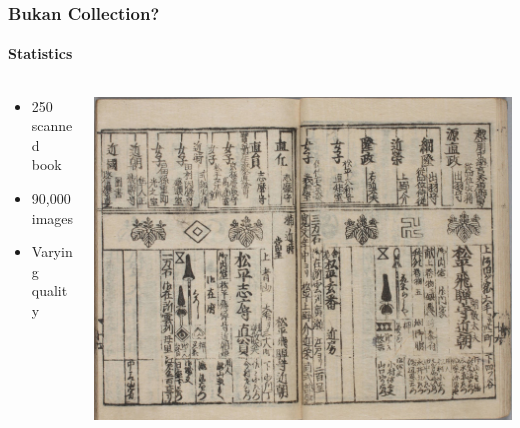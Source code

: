 \documentclass{beamer}
\begin{document}
  \begin{frame}
    \frametitle{Bukan Collection?}
    \framesubtitle{Statistics}
    \begin{columns}
      \begin{column}{0.4\linewidth}
        \begin{itemize}
        \item 250 scanned book
        \item 90,000 images
        \item Varying quality
        \end{itemize}
      \end{column}
      \begin{column}{.6\linewidth}
        \includegraphics[width=1.0\linewidth]{200018769_00020}
      \end{column}
    \end{columns}
  \end{frame}
\end{document}
